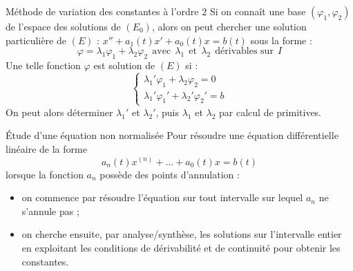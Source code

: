 \documentclass[french]{book}
\theoremstyle{plain}
\theoremstyle{definition}
\theoremstyle{remark}
\begin{document}
\begin{PM}{Méthode de variation des constantes à l'ordre $2$} Si on connaît une base $(\varphi_1,\varphi_2)$ de l'espace des solutions de $(E_0)$, alors on peut chercher une solution particulière de $(E)$ : $x''+a_1(t)x'+a_0(t)x=b(t)$ sous la forme : $$\varphi =\lambda_1\varphi_1+\lambda_2\varphi_2\ \ \text{avec}\ \ \lambda_1\ \ \text{et}\ \ \lambda_2\ \ \text{dérivables sur} \ \ I$$ Une telle fonction $\varphi$ est solution de $(E)$ si : $$\begin{cases}
	\lambda_1'\varphi_1+\lambda_2\varphi_2=0 \\
	\lambda_1'\varphi_1'+\lambda_2'\varphi_2'=b
\end{cases}$$ On peut alors déterminer $\lambda_1'$ et $\lambda_2'$, puis $\lambda_1$ et $\lambda_2$ par calcul de primitives.
\end{PM}
\begin{PM}{Étude d'une équation non normalisée} Pour résoudre une équation différentielle linéaire de la forme $$a_n(t)x^{(n)}+\ldots+a_0(t)x=b(t)$$ lorsque la fonction $a_n$ possède des points d'annulation :
\begin{itemize}
	\item on commence par résoudre l'équation sur tout intervalle sur lequel $a_n$ ne s'annule pas ;
	\item on cherche ensuite, par analyse/synthèse, les solutions sur l'intervalle entier en exploitant les conditions de dérivabilité et de continuité pour obtenir les constantes.
\end{itemize}
\end{PM}
\end{document}
